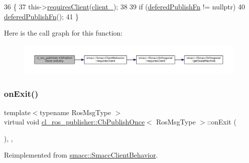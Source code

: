 \begin{DoxyCode}
36     \{
37         this->\hyperlink{classsmacc_1_1SmaccClientBehavior_a917f001e763a1059af337bf4e164f542}{requiresClient}(\hyperlink{classcl__ros__publisher_1_1CbPublishOnce_aabb127ac2192a295ce9d11c63f3c9595}{client\_});
38 
39         \textcolor{keywordflow}{if} (\hyperlink{classcl__ros__publisher_1_1CbPublishOnce_a6222a91fb87cd3118ca9f84ff857c696}{deferedPublishFn} != \textcolor{keyword}{nullptr})
40             \hyperlink{classcl__ros__publisher_1_1CbPublishOnce_a6222a91fb87cd3118ca9f84ff857c696}{deferedPublishFn}();
41     \}
\end{DoxyCode}
Here is the call graph for this function\+:
\nopagebreak
\begin{figure}[H]
\begin{center}
\leavevmode
\includegraphics[width=350pt]{classcl__ros__publisher_1_1CbPublishOnce_afaed71bc2694ec1837278d5f931a76e1_cgraph}
\end{center}
\end{figure}
\mbox{\label{classcl__ros__publisher_1_1CbPublishOnce_ad82cb7d6ac69fe9b91bc955550ab92cb}} 
\subsubsection{\texorpdfstring{on\+Exit()}{onExit()}}
{\footnotesize\ttfamily template$<$typename Ros\+Msg\+Type $>$ \\
virtual void \hyperlink{classcl__ros__publisher_1_1CbPublishOnce}{cl\+\_\+ros\+\_\+publisher\+::\+Cb\+Publish\+Once}$<$ Ros\+Msg\+Type $>$\+::on\+Exit (\begin{DoxyParamCaption}{ }\end{DoxyParamCaption})\hspace{0.3cm}{\ttfamily [inline]}, {\ttfamily [override]}, {\ttfamily [virtual]}}



Reimplemented from \hyperlink{classsmacc_1_1SmaccClientBehavior_ac0cd72d42bd00425362a97c9803ecce5}{smacc\+::\+Smacc\+Client\+Behavior}.



